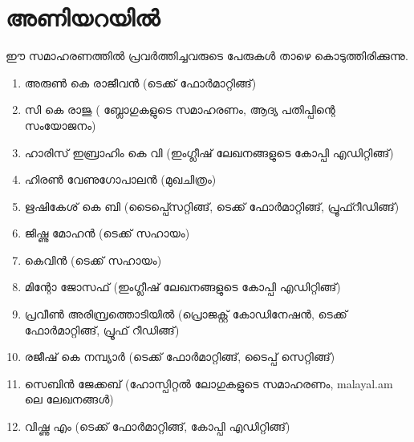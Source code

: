 \section*{അണിയറയില്‍}

ഈ സമാഹരണത്തില്‍ പ്രവര്‍ത്തിച്ചവരുടെ പേരുകള്‍ താഴെ കൊടുത്തിരിക്കുന്നു. 

\begin{enumerate}
 \item അരുണ്‍ കെ രാജീവന്‍ (ടെക്ക് ഫോര്‍മാറ്റിങ്ങ്)
 \item സി കെ രാജു ( ബ്ലോഗുകളുടെ സമാഹരണം, ആദ്യ പതിപ്പിന്റെ സംയോജനം)
 \item ഹാരിസ് ഇബ്രാഹിം  കെ വി  (ഇംഗ്ലീഷ് ലേഖനങ്ങളുടെ കോപ്പി എഡിറ്റിങ്ങ്)
 \item ഹിരണ്‍ വേണുഗോപാലന്‍ (മുഖചിത്രം)
 \item ഋഷികേശ് കെ ബി (ടൈപ്പ്സെറ്റിങ്ങ്, ടെക്ക് ഫോര്‍മാറ്റിങ്ങ്, പ്രൂഫ്റീഡിങ്ങ്)
 \item ജിഷ്ണു മോഹന്‍ (ടെക്ക് സഹായം)  
 \item കെവിന്‍ (ടെക്ക് സഹായം)
 \item മിന്റോ ജോസഫ് (ഇംഗ്ലീഷ് ലേഖനങ്ങളുടെ കോപ്പി എഡിറ്റിങ്ങ്)
 \item പ്രവീണ്‍ അരിമ്പ്രത്തൊടിയില്‍ (പ്രൊജക്റ്റ് കോഡിനേഷന്‍, ടെക്ക് ഫോര്‍മാറ്റിങ്ങ്, പ്രൂഫ് റീഡിങ്ങ്)
 \item രജീഷ് കെ നമ്പ്യാര്‍ (ടെക്ക് ഫോര്‍മാറ്റിങ്ങ്, ടൈപ്പ് സെറ്റിങ്ങ്)
 \item സെബിന്‍ ജേക്കബ് (ഹോസ്പിറ്റല്‍ ലോഗുകളുടെ സമാഹരണം, malayal.am ലെ ലേഖനങ്ങള്‍)
 \item വിഷ്ണു എം (ടെക്ക് ഫോര്‍മാറ്റിങ്ങ്, കോപ്പി എഡിറ്റിങ്ങ്)
\end{enumerate}

\newpage

